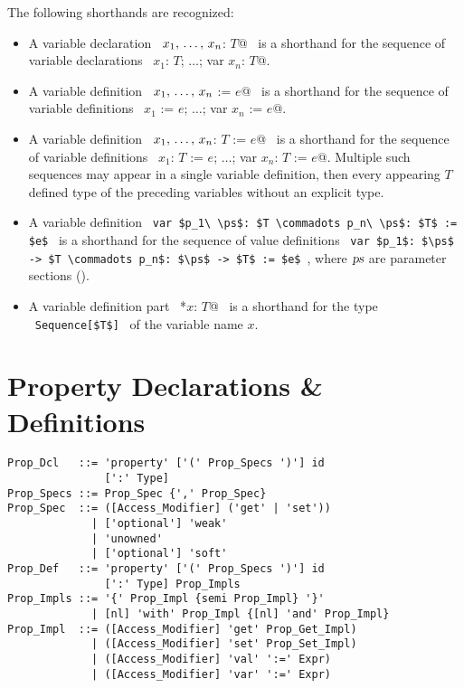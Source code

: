 The following shorthands are recognized:
\begin{itemize}
  \item[] A variable declaration ~\lstinline@var $x_1 ,\, \ldots ,\, x_n$: $T$@~ is a
shorthand for the sequence of variable declarations ~\lstinline@var $x_1$: $T$; $\ldots$; var $x_n$: $T$@. 

  \item[] A variable definition ~\lstinline@var $x_1 ,\, \ldots ,\, x_n$ := $e$@~ is a shorthand for the sequence of variable definitions ~\lstinline@var $x_1$ := $e$; $\ldots$; var $x_n$ := $e$@. 

  \item[] A variable definition ~\lstinline@var $x_1 ,\, \ldots ,\, x_n$: $T$ := $e$@~ is a shorthand for the sequence of variable definitions ~\lstinline@var $x_1$: $T$ := $e$; $\ldots$; var $x_n$: $T$ := $e$@. Multiple such sequences may appear in a single variable definition, then every appearing $T$ defined type of the preceding variables without an explicit type. 

  \item[] A variable definition ~\lstinline!var $p_1\ \ps$: $T \commadots p_n\ \ps$: $T$ := $e$!~ is a shorthand for the sequence of value definitions ~\lstinline!var $p_1$: $\ps$ -> $T \commadots p_n$: $\ps$ -> $T$ := $e$!~, where $\mbox{\sl ps}$ are parameter sections ().
  
  \item[] A variable definition part ~\lstinline@*$x$: $T$@~ is a shorthand for the type ~\lstinline!Sequence[$T$]!~ of the variable name $x$. 
\end{itemize}






\section{Property Declarations \& Definitions}
\label{sec:property-dec-dfn}

\syntax\begin{lstlisting}
Prop_Dcl   ::= 'property' ['(' Prop_Specs ')'] id 
               [':' Type]
Prop_Specs ::= Prop_Spec {',' Prop_Spec}
Prop_Spec  ::= ([Access_Modifier] ('get' | 'set')) 
             | ['optional'] 'weak'
             | 'unowned'
             | ['optional'] 'soft'
Prop_Def   ::= 'property' ['(' Prop_Specs ')'] id 
               [':' Type] Prop_Impls
Prop_Impls ::= '{' Prop_Impl {semi Prop_Impl} '}'
             | [nl] 'with' Prop_Impl {[nl] 'and' Prop_Impl}
Prop_Impl  ::= ([Access_Modifier] 'get' Prop_Get_Impl)
             | ([Access_Modifier] 'set' Prop_Set_Impl)
             | ([Access_Modifier] 'val' ':=' Expr)
             | ([Access_Modifier] 'var' ':=' Expr)
\end{lstlisting}

